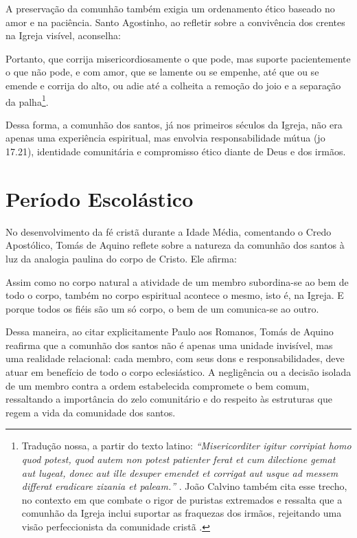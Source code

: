 A preservação da comunhão também exigia um ordenamento ético baseado no amor e na paciência. Santo Agostinho, ao refletir sobre a convivência dos crentes na Igreja visível, aconselha:

\begin{citacao}
Portanto, que corrija misericordiosamente o que pode, mas suporte pacientemente o que não pode, e com amor, que se lamente ou se empenhe, até que ou se emende e corrija do alto, ou adie até a colheita a remoção do joio e a separação da palha\footnote{Tradução nossa, a partir do texto latino: \textit{``\foreignlanguage{latin}{Misericorditer igitur corripiat homo quod potest, quod autem non potest patienter ferat et cum dilectione gemat aut lugeat, donec aut ille desuper emendet et corrigat aut usque ad messem differat eradicare zizania et paleam.}''} \cite[livro~III, capítulo~1, seção~15]{agostinhoContraParmeniani}. João Calvino também cita esse trecho, no contexto em que combate o rigor de puristas extremados e ressalta que a comunhão da Igreja inclui suportar as fraquezas dos irmãos, rejeitando uma visão perfeccionista da comunidade cristã \cite[v.~4, cap.~1, seção~16, p.~1887]{calvino2022}.}.
\end{citacao}

Dessa forma, a comunhão dos santos, já nos primeiros séculos da Igreja, não era apenas uma experiência espiritual, mas envolvia responsabilidade mútua (\gls{jo} 17.21), identidade comunitária e compromisso ético diante de Deus e dos irmãos.

\section{Período Escolástico}

No desenvolvimento da fé cristã durante a Idade Média, comentando o Credo Apostólico, Tomás de Aquino reflete sobre a natureza da comunhão dos santos à luz da analogia paulina do corpo de Cristo. Ele afirma:
\begin{citacao}
Assim como no corpo natural a atividade de um membro subordina-se ao bem de todo o corpo, também no corpo espiritual acontece o mesmo, isto é, na Igreja. E porque todos os fiéis são um só corpo, o bem de um comunica-se ao outro. \cite[p.~79]{aquinoCredo2004}
\end{citacao}

Dessa maneira, ao citar explicitamente Paulo aos Romanos, Tomás de Aquino reafirma que a comunhão dos santos não é apenas uma unidade invisível, mas uma realidade relacional: cada membro, com seus dons e responsabilidades, deve atuar em benefício de todo o corpo eclesiástico. A negligência ou a decisão isolada de um membro contra a ordem estabelecida compromete o bem comum, ressaltando a importância do zelo comunitário e do respeito às estruturas que regem a vida da comunidade dos santos.

